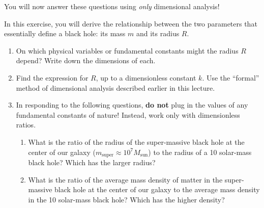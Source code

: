 \documentclass[11pt, letterpaper, openany]{book}
\newenvironment{exercise}[1][Exercise]{%
  \tcolorbox[blanker, breakable, left=1em,
    before skip=1em, after skip=1em,
    borderline west={3pt}{0pt}{PhysNavy},
    colback=PhysCream,
    before upper={\textcolor{PhysNavy}{\sffamily\bfseries #1:}\space}
  ]%
}{%
  \endtcolorbox%
}
\begin{document}
You will now answer these questions using \textit{only} dimensional analysis!

\begin{exercise}[Exercise 5]
In this exercise, you will derive the relationship between the two parameters that essentially define a black hole: its mass $m$ and its radius $R$.
\begin{enumerate}[label=(\alph*)]
    \item On which physical variables or fundamental constants might the radius $R$ depend? Write down the dimensions of each.
    \item Find the expression for $R$, up to a dimensionless constant $k$. Use the ``formal'' method of dimensional analysis described earlier in this lecture.
    \item In responding to the following questions, \textbf{do not} plug in the values of any fundamental constants of nature! Instead, work only with dimensionless ratios.
    \begin{enumerate}[label=(\roman*)]
        \item What is the ratio of the radius of the super-massive black hole at the center of our galaxy ($m_{\text{super}} \approx 10^7 M_{\text{sun}}$) to the radius of a 10 solar-mass black hole? Which has the larger radius?
        \item What is the ratio of the average mass density of matter in the super-massive black hole at the center of our galaxy to the average mass density in the 10 solar-mass black hole? Which has the higher density?
    \end{enumerate}
\end{enumerate}
\end{exercise}
\end{document}
